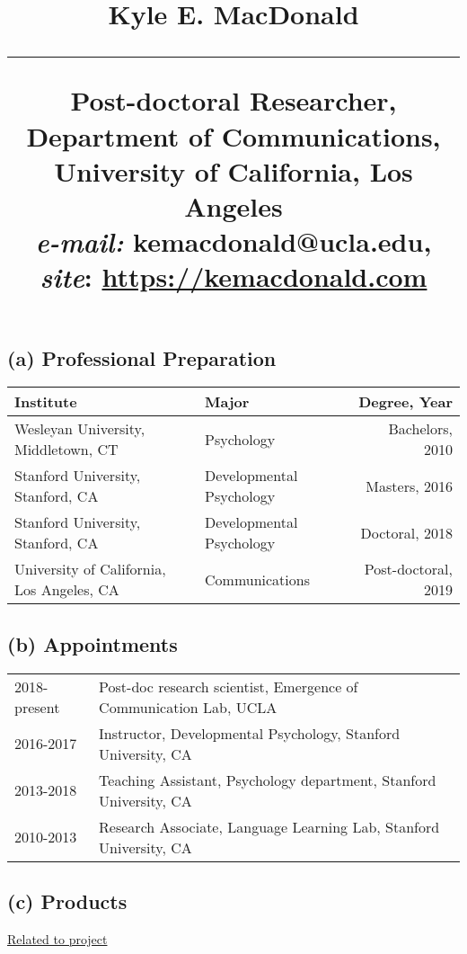 \documentclass[svgnames,11pt]{article}
\title{%
        \vspace{-2\baselineskip}
            \normalsize
            {\textbf{Kyle E. MacDonald }}\\
            \vspace{0.5\baselineskip}
            \hrule
            \vspace{0.5\baselineskip}
            Post-doctoral Researcher, Department of Communications, University of California, Los Angeles\\
            \textit{e-mail:} kemacdonald@ucla.edu,
            \textit{site}: \href{https://kemacdonald.com}{https://kemacdonald.com}
        \vspace{-1.5ex}
}
\date{}
\begin{document}
\maketitle
\vspace{-4\baselineskip}
\subsection*{(a) Professional Preparation}
\begin{table}[H]
\centering
\begin{tabular}{llr}
\hline
Institute                                                & Major          & Degree, Year            \\ \hline
Wesleyan University, Middletown, CT                      & Psychology     & Bachelors, 2010       \\
Stanford University, Stanford, CA                        & Developmental Psychology  & Masters, 2016       \\
Stanford University, Stanford, CA                        & Developmental Psychology  & Doctoral, 2018       \\
University of California, Los Angeles, CA                & Communications            & Post-doctoral, 2019
\end{tabular}
\end{table}

\subsection*{(b) Appointments}
\begin{table}[H]
\centering
\begin{tabular}{ll}
2018-present   & Post-doc research scientist, Emergence of Communication Lab, UCLA \\
2016-2017   & Instructor, Developmental Psychology, Stanford University, CA                \\
2013-2018   & Teaching Assistant, Psychology department, Stanford University, CA                   \\
2010-2013   & Research Associate, Language Learning Lab, Stanford University, CA                        
\end{tabular}
\end{table}
\subsection*{(c) Products}

\underline{Related to project}
\nocite{macdonald2018real}
\nocite{macdonald2018noise}
\nocite{macdonald2017information}
\nocite{macdonald2018children}
\nocite{macdonald2019integration}
\end{document}
